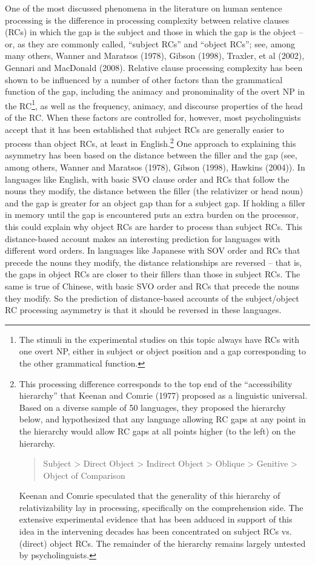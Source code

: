 \documentclass[a4paper]{article}
\begin{document}
One of the most discussed phenomena in the literature on human sentence processing is the difference in processing complexity between relative clauses (RCs) in which the gap is the subject and those in which the gap is the object -- or, as they are commonly called, ``subject RCs'' and ``object RCs''; see, among many others, Wanner and Maratsos (1978), Gibson (1998), Traxler, et al (2002), Gennari and MacDonald (2008).  Relative clause processing complexity has been shown to be influenced by a number of other factors than the grammatical function of the gap, including the animacy and pronominality of the overt NP in the RC\footnote{The stimuli in the experimental studies on this topic always have RCs with one overt NP, either in subject or object position and a gap corresponding to the other grammatical function.}, as well as the frequency, animacy, and discourse properties of the head of the RC.  When these factors are controlled for, however, most psycholinguists accept that it has been established that subject RCs are generally easier to process than object RCs, at least in English.\footnote{This processing difference corresponds to the top end of the ``accessibility hierarchy'' that Keenan and Comrie (1977) proposed as a linguistic universal. Based on a diverse sample of 50 languages, they proposed the hierarchy below, and hypothesized that any language allowing RC gaps at any point in the hierarchy would allow RC gaps at all points higher (to the left) on the hierarchy.
\begin{quote}

Subject 
> 
Direct Object 
> 
Indirect Object 
> 
Oblique 
> 
Genitive
> 
Object of Comparison
\end{quote}
Keenan and Comrie speculated that the generality of this hierarchy of relativizability lay in processing, specifically on the comprehension side.  The extensive experimental evidence that has been adduced in support of this idea in the intervening decades has been concentrated on subject RCs vs. (direct) object RCs.  The remainder of the hierarchy remains largely untested by psycholinguists.}
\newline
\newline
One approach to explaining this asymmetry has been based on the distance between the filler and the gap (see, among others, Wanner and Maratsos (1978), Gibson (1998), Hawkins (2004)).  In languages like English, with basic SVO clause order and RCs that follow the nouns they modify, the distance between the filler (the relativizer or head noun) and the gap is greater for an object gap than for a subject gap.  If holding a filler in memory until the gap is encountered puts an extra burden on the processor, this could explain why object RCs are harder to process than subject RCs.   This distance-based account makes an interesting prediction for languages with different word orders.  In languages like Japanese with SOV order and RCs that precede the nouns they modify, the distance relationships are reversed -- that is, the gaps in object RCs are closer to their fillers than those in subject RCs.  The same is true of Chinese, with basic SVO order and RCs that precede the nouns they modify.  So the prediction of distance-based accounts of the subject/object RC processing asymmetry is that it should be reversed in these languages.
\end{document}
